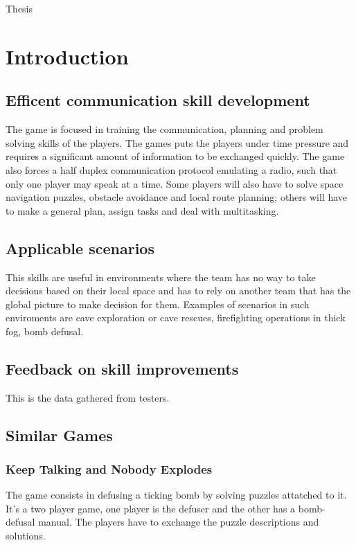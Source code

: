 \documentclass{article}
\begin{document}
\setlength{\parindent}{0in}

\begin {center}
\large Thesis
\end{center}

\tableofcontents
\clearpage

\section{Introduction}
\subsection{Efficent communication skill development}
The game is focused in training the communication, planning and problem solving skills of the players. The games puts the players under time pressure and requires a significant amount of information to be exchanged quickly. The game also forces a half duplex communication protocol emulating a radio, such that only one player may speak at a time. Some players will also have to solve space navigation puzzles, obstacle avoidance and local route planning; others will have to make a general plan, assign tasks and deal with multitasking.
\subsection{Applicable scenarios}
This skills are useful in environments where the team has no way to take decisions based on their local space and has to rely on another team that has the global picture to make decision for them. Examples of scenarios in such enviroments are cave exploration or cave rescues, firefighting operations in thick fog, bomb defusal. 
\subsection{Feedback on skill improvements}
This is the data gathered from testers.

\subsection{Similar Games}
\subsubsection{Keep Talking and Nobody Explodes}
The game consists in defusing a ticking bomb by solving puzzles attatched to it. It's a two player game, one player is the defuser and the other has a bomb-defusal manual. The players have to exchange the puzzle descriptions and solutions. 
\end{document}
